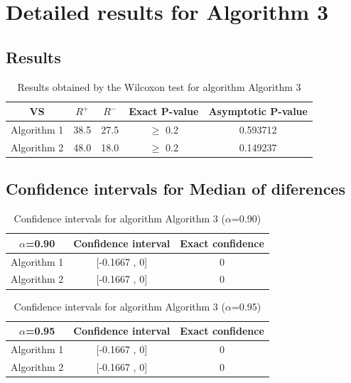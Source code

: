 \documentclass[a4paper,10pt]{article}
\begin{document}
 \clearpage 


\section{Detailed results for Algorithm 3}


\subsection{Results}

\begin{table}[!htp]
\centering\small
\begin{tabular}{
|c|c|c|c|c|}
\hline
 VS & $R^{+}$ & $R^{-}$ & Exact P-value & Asymptotic P-value \\ \hline 
Algorithm 1 & 38.5 & 27.5 & $\geq$ 0.2 & 0.593712\\ \hline 
Algorithm 2 & 48.0 & 18.0 & $\geq$ 0.2 & 0.149237\\ \hline 

\end{tabular}
\caption{Results obtained by the Wilcoxon test for algorithm Algorithm 3}
\end{table}

\subsection{Confidence intervals for Median of diferences}

\begin{table}[!htp]
\centering\small
\begin{tabular}{
|c|c|c|}
\hline
 $\alpha$=0.90 & Confidence interval & Exact confidence \\ \hline 
Algorithm 1 & [-0.1667 , 0] & 0\\ \hline 
Algorithm 2 & [-0.1667 , 0] & 0\\ \hline 

\end{tabular}
\caption{Confidence intervals for algorithm Algorithm 3 ($\alpha$=0.90)}
\end{table}
\begin{table}[!htp]
\centering\small
\begin{tabular}{
|c|c|c|}
\hline
 $\alpha$=0.95 & Confidence interval & Exact confidence \\ \hline 
Algorithm 1 & [-0.1667 , 0] & 0\\ \hline 
Algorithm 2 & [-0.1667 , 0] & 0\\ \hline 

\end{tabular}
\caption{Confidence intervals for algorithm Algorithm 3 ($\alpha$=0.95)}
\end{table}

 \clearpage 
\end{document}
